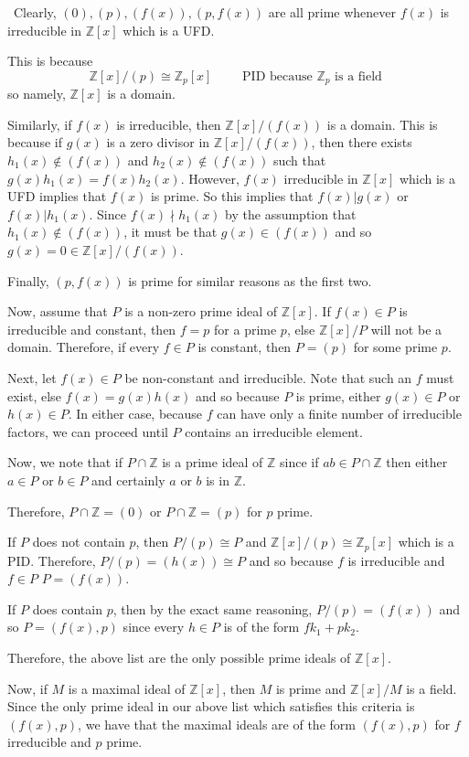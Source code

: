 \documentclass[12pt]{Qual}
\begin{document}
\begin{solution}$\,$
 Clearly, $(0), (p),(f(x)),(p,f(x))$ are all prime whenever $f(x)$ is irreducible in $\mathbb{Z}[x]$ which is a UFD.

This is because $$\mathbb{Z}[x]/(p)\cong\mathbb{Z}_p[x]\qquad\text{ PID because }\mathbb{Z}_p\text{ is a field }$$ so namely, $\mathbb{Z}[x]$ is a domain.

Similarly, if $f(x)$ is irreducible, then $\mathbb{Z}[x]/(f(x))$ is a domain. This is because if $g(x)$ is a zero divisor in $\mathbb{Z}[x]/(f(x))$, then there exists $h_1(x)\notin (f(x))$ and $h_2(x)\notin (f(x))$ such that $g(x)h_1(x)=f(x)h_2(x)$. However, $f(x)$ irreducible in $\mathbb{Z}[x]$ which is a UFD implies that $f(x)$ is prime. So this implies that $f(x)|g(x)$ or $f(x)|h_1(x)$. Since $f(x)\nmid h_1(x)$ by the assumption that $h_1(x)\notin(f(x))$, it must be that $g(x)\in(f(x))$ and so $g(x)=0\in\mathbb{Z}[x]/(f(x))$.

Finally, $(p,f(x))$ is prime for similar reasons as the first two.

Now, assume that $P$ is a non-zero prime ideal of $\mathbb{Z}[x]$. If $f(x)\in P$ is irreducible and constant, then $f=p$ for a prime $p$, else $\mathbb{Z}[x]/P$ will not be a domain. Therefore, if every $f\in P$ is constant, then $P=(p)$ for some prime $p.$

Next, let $f(x)\in P$ be non-constant and irreducible. Note that such an $f$ must exist, else $f(x)=g(x)h(x)$ and so because $P$ is prime, either $g(x)\in P$ or $h(x)\in P$. In either case, because $f$ can have only a finite number of irreducible factors, we can proceed until $P$ contains an irreducible element.

Now, we note that if $P\cap\mathbb{Z}$ is a prime ideal of $\mathbb{Z}$ since if $ab\in P\cap\mathbb{Z}$ then either $a\in P$ or $b\in P$ and certainly $a$ or $b$ is in $\mathbb{Z}$.

Therefore, $P\cap\mathbb{Z}=(0)$ or $P\cap\mathbb{Z}=(p)$ for $p$ prime.

If $P$ does not contain $p$, then $P/(p)\cong P$ and $\mathbb{Z}[x]/(p)\cong\mathbb{Z}_p[x]$ which is a PID. Therefore, $P/(p)=(h(x))\cong P$ and so because $f$ is irreducible and $f\in P$ $P=(f(x))$.

If $P$ does contain $p$, then by the exact same reasoning, $P/(p)=(f(x))$ and so $P=(f(x),p)$ since every $h\in P$ is of the form $fk_1+pk_2$.

Therefore, the above list are the only possible prime ideals of $\mathbb{Z}[x].$

 Now, if $M$ is a maximal ideal of $\mathbb{Z}[x]$, then $M$ is prime and $\mathbb{Z}[x]/M$ is a field. Since the only prime ideal in our above list which satisfies this criteria is $(f(x),p)$, we have that the maximal ideals are of the form $(f(x),p)$ for $f$ irreducible and $p$ prime.
\end{solution}
\newpage
\end{document}
